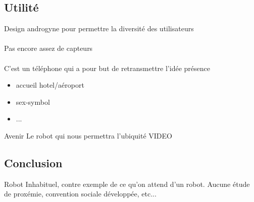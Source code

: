 \documentclass{beamer}
\begin{document}
\subsection{Utilité}
\begin{frame}
Design androgyne pour permettre la diversité des utilisateurs
\\~\\
Pas encore assez de capteurs
\\~\\
C'est un téléphone qui a pour but de retransmettre l'idée présence
\\
  \begin{itemize}
  \item accueil hotel/aéroport
  \item sex-symbol
  \item ...
  \end{itemize}
\end{frame}

\begin{frame}{Avenir}
  Le robot qui nous permettra l'ubiquité
  \vspace{0.5cm}  
  VIDEO
\end{frame}

\subsection{Conclusion}
\begin{frame}
  Robot Inhabituel, contre exemple de ce qu'on attend d'un robot.
  Aucune étude de proxémie, convention sociale développée, etc...
\end{frame}
\end{document}
